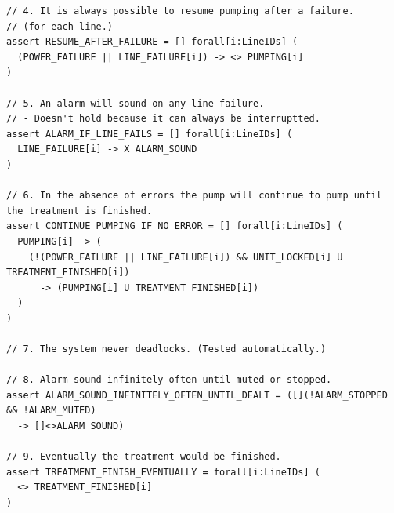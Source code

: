 \documentclass[titlepage]{article}
\begin{document}
\begin{verbatim}
// 4. It is always possible to resume pumping after a failure.
// (for each line.)
assert RESUME_AFTER_FAILURE = [] forall[i:LineIDs] (
  (POWER_FAILURE || LINE_FAILURE[i]) -> <> PUMPING[i]
)

// 5. An alarm will sound on any line failure.
// - Doesn't hold because it can always be interruptted.
assert ALARM_IF_LINE_FAILS = [] forall[i:LineIDs] (
  LINE_FAILURE[i] -> X ALARM_SOUND
)

// 6. In the absence of errors the pump will continue to pump until the treatment is finished.
assert CONTINUE_PUMPING_IF_NO_ERROR = [] forall[i:LineIDs] (
  PUMPING[i] -> (
    (!(POWER_FAILURE || LINE_FAILURE[i]) && UNIT_LOCKED[i] U TREATMENT_FINISHED[i])
      -> (PUMPING[i] U TREATMENT_FINISHED[i])
  )
)

// 7. The system never deadlocks. (Tested automatically.)

// 8. Alarm sound infinitely often until muted or stopped.
assert ALARM_SOUND_INFINITELY_OFTEN_UNTIL_DEALT = ([](!ALARM_STOPPED && !ALARM_MUTED)
  -> []<>ALARM_SOUND)

// 9. Eventually the treatment would be finished.
assert TREATMENT_FINISH_EVENTUALLY = forall[i:LineIDs] (
  <> TREATMENT_FINISHED[i]
)
\end{verbatim}
\end{document}
